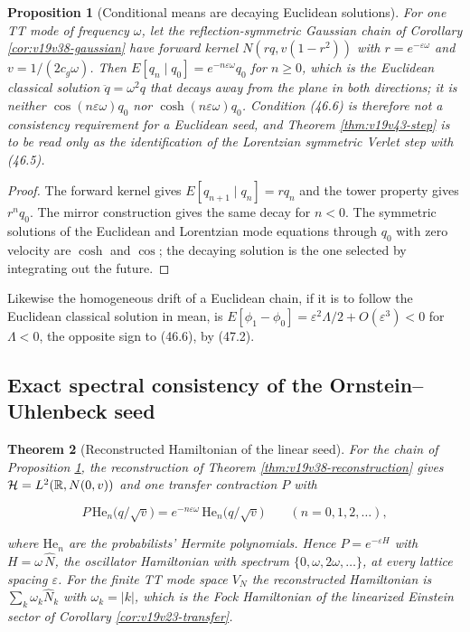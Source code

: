\documentclass[11pt]{article}
\newtheorem{theorem}{Theorem}[section]
\newtheorem{proposition}[theorem]{Proposition}
\theoremstyle{remark}
\begin{document}
\begin{proposition}[Conditional means are decaying Euclidean solutions]
\label{prop:v19v44-mean}
For one TT mode of frequency \(\omega\), let the reflection-symmetric
Gaussian chain of Corollary \ref{cor:v19v38-gaussian} have forward
kernel \(N(rq,v(1-r^2))\) with \(r=e^{-\varepsilon\omega}\) and
\(v=1/(2c_g\omega)\).  Then \(E[q_n\mid q_0]=e^{-n\varepsilon\omega}q_0\)
for \(n\geq0\), which is the Euclidean classical solution
\(\ddot q=\omega^2q\) that decays away from the plane in both
directions; it is neither \(\cos(n\varepsilon\omega)q_0\) nor
\(\cosh(n\varepsilon\omega)q_0\).  Condition (46.6) is therefore not a
consistency requirement for a Euclidean seed, and Theorem
\ref{thm:v19v43-step} is to be read only as the identification of the
Lorentzian symmetric Verlet step with (46.5).
\end{proposition}

\begin{proof}
The forward kernel gives \(E[q_{n+1}\mid q_n]=rq_n\) and the tower
property gives \(r^nq_0\).  The mirror construction gives the same
decay for \(n<0\).  The symmetric solutions of the Euclidean and
Lorentzian mode equations through \(q_0\) with zero velocity are
\(\cosh\) and \(\cos\); the decaying solution is the one selected by
integrating out the future.
\end{proof}

Likewise the homogeneous drift of a Euclidean chain, if it is to follow
the Euclidean classical solution in mean, is
\(E[\phi_1-\phi_0]=\varepsilon^2\Lambda/2+O(\varepsilon^3)<0\) for
\(\Lambda<0\), the opposite sign to (46.6), by (47.2).

\subsection{Exact spectral consistency of the Ornstein--Uhlenbeck seed}

\begin{theorem}[Reconstructed Hamiltonian of the linear seed]
\label{thm:v19v44-spectrum}
For the chain of Proposition \ref{prop:v19v44-mean}, the reconstruction
of Theorem \ref{thm:v19v38-reconstruction} gives
\({\cal H}=L^2(\mathbb R,N(0,v))\) and one transfer contraction
\(P\) with

\[
 P\,\mathrm{He}_n\bigl(q/\sqrt v\bigr)=e^{-n\varepsilon\omega}\,\mathrm{He}_n\bigl(q/\sqrt v\bigr)
 \qquad(n=0,1,2,\dots),                                              \tag{47.3}
\]

where \(\mathrm{He}_n\) are the probabilists' Hermite polynomials.
Hence \(P=e^{-\varepsilon H}\) with \(H=\omega\,\widehat N\), the
oscillator Hamiltonian with spectrum \(\{0,\omega,2\omega,\dots\}\), at
every lattice spacing \(\varepsilon\).  For the finite TT mode space
\(V_N\) the reconstructed Hamiltonian is \(\sum_k\omega_k\widehat N_k\)
with \(\omega_k=|k|\), which is the Fock Hamiltonian of the linearized
Einstein sector of Corollary \ref{cor:v19v23-transfer}.
\end{theorem}
\end{document}
